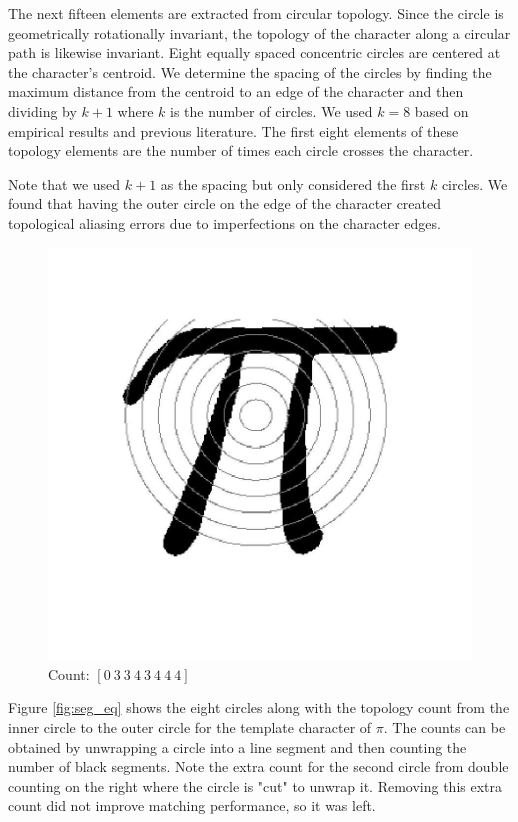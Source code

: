 \documentclass[journal]{IEEEtran}
\begin{document}
The next fifteen elements are extracted from circular topology. Since the circle is geometrically rotationally invariant, the topology of the character along a circular path is likewise invariant. Eight equally spaced concentric circles are centered at the character’s centroid. We determine the spacing of the circles by finding the maximum distance from the centroid to an edge of the character and then dividing by $k+1$ where $k$ is the number of circles. We used $k=8$ based on empirical results and previous literature\cite{Torres-Mendez:article_typical}. The first eight elements of these topology elements are the number of times each circle crosses the character.

Note that we used $k+1$ as the spacing but only considered the first $k$ circles. We found that having the outer circle on the edge of the character created topological aliasing errors due to imperfections on the character edges.

\begin{figure}[!t]
    \centering
    \includegraphics[width=\columnwidth]{pi_hu}
    \caption{Count: $[0\ 3\ 3\ 4\ 3\ 4\ 4\ 4]$}
    \label{fig:pi_hu}
\end{figure}

Figure \ref{fig:seg_eq} shows the eight circles along with the topology count from the inner circle to the outer circle for the template character of $\pi$. The counts can be obtained by unwrapping a circle into a line segment and then counting the number of black segments. Note the extra count for the second circle from double counting on the right where the circle is "cut" to unwrap it. Removing this extra count did not improve matching performance, so it was left.
\end{document}
